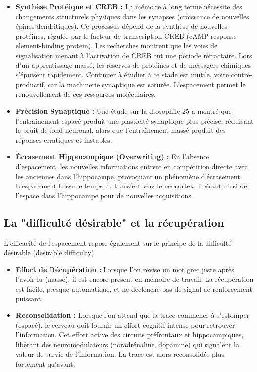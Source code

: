 \begin{itemize}\item \textbf{Synthèse Protéique et CREB :} La mémoire à long terme nécessite des changements structurels physiques dans les synapses (croissance de nouvelles épines dendritiques). Ce processus dépend de la synthèse de nouvelles protéines, régulée par le facteur de transcription CREB (cAMP response element-binding protein). Les recherches montrent que les voies de signalisation menant à l'activation de CREB ont une période réfractaire. Lors d'un apprentissage massé, les réserves de protéines et de messagers chimiques s'épuisent rapidement. Continuer à étudier à ce stade est inutile, voire contre-productif, car la machinerie synaptique est saturée.\cite{III-3-1-ref23} L'espacement permet le renouvellement de ces ressources moléculaires.\item \textbf{Précision Synaptique :} Une étude sur la drosophile 25 a montré que l'entraînement espacé produit une plasticité synaptique plus \og précise\fg{}, réduisant le bruit de fond neuronal, alors que l'entraînement massé produit des réponses erratiques et instables.\item \textbf{Écrasement Hippocampique (Overwriting) :} En l'absence d'espacement, les nouvelles informations entrent en compétition directe avec les anciennes dans l'hippocampe, provoquant un phénomène d'écrasement. L'espacement laisse le temps au transfert vers le néocortex, libérant ainsi de l'espace dans l'hippocampe pour de nouvelles acquisitions.\cite{III-3-1-ref26}\end{itemize}

\subsection{La "difficulté désirable" et la récupération}

L'efficacité de l'espacement repose également sur le principe de la \og difficulté désirable\fg{}
(desirable difficulty).

\begin{itemize}\item \textbf{Effort de Récupération :} Lorsque l'on révise un mot grec juste après l'avoir lu (massé), il est encore présent en mémoire de travail. La récupération est facile, presque automatique, et ne déclenche pas de signal de renforcement puissant.\item \textbf{Reconsolidation :} Lorsque l'on attend que la trace commence à s'estomper (espacé), le cerveau doit fournir un effort cognitif intense pour retrouver l'information. Cet effort active des circuits préfrontaux et hippocampiques, libérant des neuromodulateurs (noradrénaline, dopamine) qui signalent la \og valeur de survie\fg{} de l'information. La trace est alors reconsolidée plus fortement qu'avant.\cite{III-3-1-ref22}\end{itemize}

